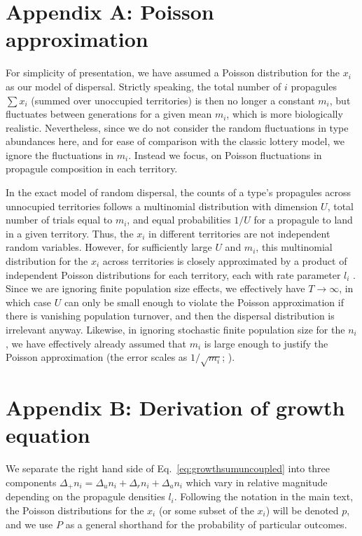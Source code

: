 \documentclass[12pt]{article}
\begin{document}

 

\section*{Appendix A: Poisson approximation}

For simplicity of presentation, we have assumed a Poisson distribution for the $x_i$ as our model of dispersal. Strictly speaking, the total number of $i$ propagules $\sum x_i$ (summed over unoccupied territories) is then no longer a constant $m_i$, but fluctuates between generations for a given mean $m_i$, which is more biologically realistic. Nevertheless, since we do not consider the random fluctuations in type abundances here, and for ease of comparison with the classic lottery model, we ignore the fluctuations in $m_i$. Instead we focus, on Poisson fluctuations in propagule composition in each territory. 

In the exact model of random dispersal, the counts of a type's propagules across unnocupied territories follows a multinomial distribution with dimension $U$, total number of trials equal to $m_i$, and equal probabilities $1/U$ for a propagule to land in a given territory. Thus, the $x_i$ in different territories are not independent random variables. However, for sufficiently large $U$ and $m_i$, this multinomial distribution for the $x_i$ across territories is closely approximated by a product of independent Poisson distributions for each territory, each with rate parameter $l_i$ \citep[Theorem 1]{arenbaev_1977}. Since we are ignoring finite population size effects, we effectively have $T\rightarrow \infty$, in which case $U$ can only be small enough to violate the Poisson approximation if there is vanishing population turnover, and then the dispersal distribution is irrelevant anyway. Likewise, in ignoring stochastic finite population size for the $n_i$, we have effectively already assumed that $m_i$ is large enough to justify the Poisson approximation (the error scales as $1/\sqrt{m_i}$; \citealt{arenbaev_1977}).

\section*{Appendix B: Derivation of growth equation}

We separate the right hand side of Eq.~\eqref{eq:growthsumuncoupled} into three components $\Delta_+ n_i = \Delta_u n_i+\Delta_r n_i+\Delta_a n_i$ which vary in relative magnitude depending on the propagule densities $l_i$. Following the notation in the main text, the Poisson distributions for the $x_i$ (or some subset of the $x_i$) will be denoted $p$, and we use $P$ as a general shorthand for the probability of particular outcomes.
\end{document}

